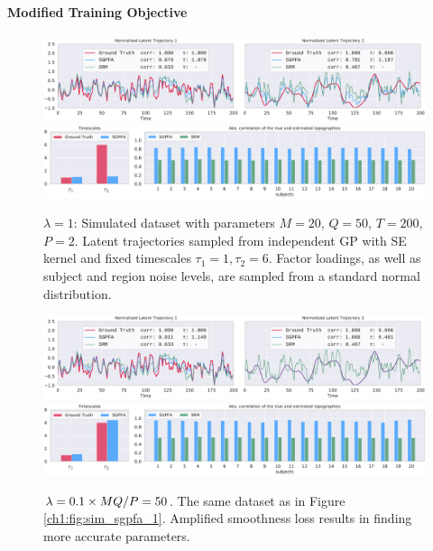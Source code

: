 \paragraph{Modified Training Objective}
\label{ch1:sec:lambdaloss}

\begin{figure}[tb!]
    \centering
    \includegraphics[width=\linewidth]{figs/ch1/sim_sgpfa_latent_1.pdf}
    \includegraphics[width=\linewidth]{figs/ch1/sim_sgpfa_par_1.pdf}
    \caption{$\lambda=1$: Simulated dataset with parameters $M=20$, $Q=50$, $T=200$, $P=2$. Latent trajectories sampled from independent GP with SE kernel and fixed timescales $\tau_1=1, \tau_2=6$. Factor loadings, as well as subject and region noise levels, are sampled from a standard normal distribution.} \label{ch1:fig:sim_sgpfa_1}
    \vspace{15pt}
    \includegraphics[width=\linewidth]{figs/ch1/sim_sgpfa_latent_2.pdf}
    \includegraphics[width=\linewidth]{figs/ch1/sim_sgpfa_par_2.pdf}
    \caption{$\lambda=0.1 \times MQ/P=50$. The same dataset as in Figure \ref{ch1:fig:sim_sgpfa_1}. Amplified smoothness loss results in finding more accurate parameters.} \label{ch1:fig:sim_sgpfa_2}
\end{figure}

